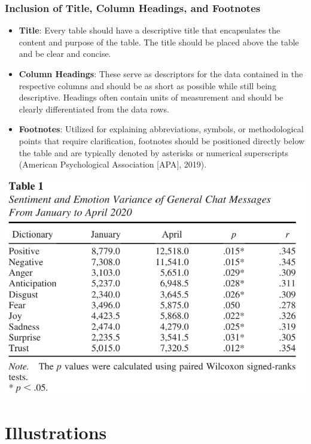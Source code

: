 \documentclass[
  b5paper]{book}
\begin{document}
\hypertarget{inclusion-of-title-column-headings-and-footnotes}{%
\subsubsection*{Inclusion of Title, Column Headings, and Footnotes}\label{inclusion-of-title-column-headings-and-footnotes}}

\begin{itemize}
\item
  \textbf{Title}: Every table should have a descriptive title that encapsulates the content and purpose of the table. The title should be placed above the table and be clear and concise.
\item
  \textbf{Column Headings}: These serve as descriptors for the data contained in the respective columns and should be as short as possible while still being descriptive. Headings often contain units of measurement and should be clearly differentiated from the data rows.
\item
  \textbf{Footnotes}: Utilized for explaining abbreviations, symbols, or methodological points that require clarification, footnotes should be positioned directly below the table and are typically denoted by asterisks or numerical superscripts (American Psychological Association {[}APA{]}, 2019).
\end{itemize}

\includegraphics[width=1\textwidth,height=\textheight]{images/table.png}

\hypertarget{illustrations}{%
\section{Illustrations}\label{illustrations}}
\end{document}

